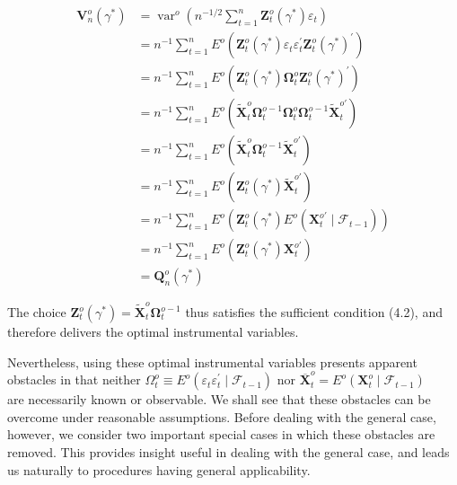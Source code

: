 \documentclass[10pt]{article}
\begin{document}
$$
\begin{aligned}
\mathbf{V}_{n}^{o}\left(\gamma^{*}\right) & =\operatorname{var}^{o}\left(n^{-1 / 2} \sum_{t=1}^{n} \mathbf{Z}_{t}^{o}\left(\gamma^{*}\right) \varepsilon_{t}\right) \\
& =n^{-1} \sum_{t=1}^{n} E^{o}\left(\mathbf{Z}_{t}^{o}\left(\gamma^{*}\right) \varepsilon_{t} \varepsilon_{t}^{\prime} \mathbf{Z}_{t}^{o}\left(\gamma^{*}\right)^{\prime}\right) \\
& =n^{-1} \sum_{t=1}^{n} E^{o}\left(\mathbf{Z}_{t}^{o}\left(\gamma^{*}\right) \boldsymbol{\Omega}_{t}^{o} \mathbf{Z}_{t}^{o}\left(\gamma^{*}\right)^{\prime}\right) \\
& =n^{-1} \sum_{t=1}^{n} E^{o}\left(\tilde{\mathbf{X}}_{t}^{o} \boldsymbol{\Omega}_{t}^{o-1} \boldsymbol{\Omega}_{t}^{o} \boldsymbol{\Omega}_{t}^{o-1} \tilde{\mathbf{X}}_{t}^{o \prime}\right) \\
& =n^{-1} \sum_{t=1}^{n} E^{o}\left(\tilde{\mathbf{X}}_{t}^{o} \boldsymbol{\Omega}_{t}^{o-1} \tilde{\mathbf{X}}_{t}^{o \prime}\right) \\
& =n^{-1} \sum_{t=1}^{n} E^{o}\left(\mathbf{Z}_{t}^{o}\left(\gamma^{*}\right) \tilde{\mathbf{X}}_{t}^{o \prime}\right) \\
& =n^{-1} \sum_{t=1}^{n} E^{o}\left(\mathbf{Z}_{t}^{o}\left(\gamma^{*}\right) E^{o}\left(\mathbf{X}_{t}^{o \prime} \mid \mathcal{F}_{t-1}\right)\right) \\
& =n^{-1} \sum_{t=1}^{n} E^{o}\left(\mathbf{Z}_{t}^{o}\left(\gamma^{*}\right) \mathbf{X}_{t}^{o \prime}\right) \\
& =\mathbf{Q}_{n}^{o}\left(\gamma^{*}\right)
\end{aligned}
$$

The choice $\mathbf{Z}_{t}^{o}\left(\gamma^{*}\right)=\tilde{\mathbf{X}}_{t}^{o} \boldsymbol{\Omega}_{t}^{o-1}$ thus satisfies the sufficient condition (4.2), and therefore delivers the optimal instrumental variables.

Nevertheless, using these optimal instrumental variables presents apparent obstacles in that neither $\Omega_{t}^{o} \equiv E^{o}\left(\varepsilon_{t} \varepsilon_{t}^{\prime} \mid \mathcal{F}_{t-1}\right)$ nor $\overline{\mathbf{X}}_{t}^{o}=E^{o}\left(\mathbf{X}_{t}^{o} \mid \mathcal{F}_{t-1}\right)$\\
are necessarily known or observable. We shall see that these obstacles can be overcome under reasonable assumptions. Before dealing with the general case, however, we consider two important special cases in which these obstacles are removed. This provides insight useful in dealing with the general case, and leads us naturally to procedures having general applicability.
\end{document}
